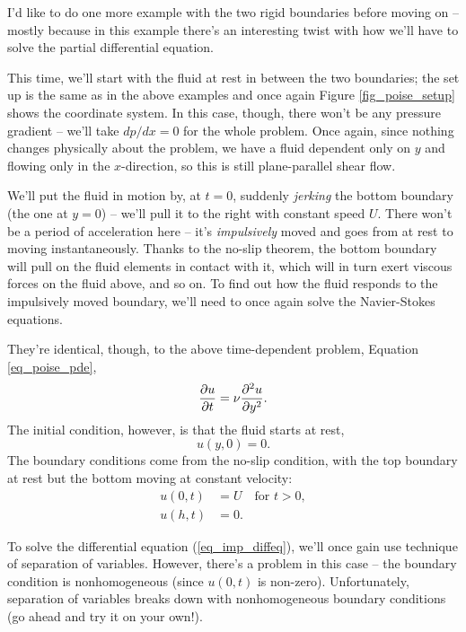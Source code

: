I'd like to do one more example with the two rigid boundaries before moving on -- mostly because in this example there's an interesting twist with how we'll have to solve the partial differential equation.


This time, we'll start with the fluid at rest in between the two boundaries; the set up is the same as in the above examples and  once again Figure \ref{fig_poise_setup} shows the coordinate system.  In this case, though, there won't be any pressure gradient -- we'll take $dp/dx = 0$ for the whole problem.  Once again, since nothing changes physically about the problem, we have a fluid dependent only on $y$ and flowing only in the $x$-direction, so this is still plane-parallel shear flow.  

We'll put the fluid in motion by, at $t = 0$,  suddenly \emph{jerking} the bottom boundary (the one at $y=0$)  -- we'll pull it to the right with constant speed $U$.  There won't be a period of acceleration here -- it's \emph{impulsively} moved and goes from at rest to moving instantaneously.  Thanks to the no-slip theorem, the bottom boundary will pull on the fluid elements in contact with it, which will in turn exert viscous forces on the fluid above, and so on.  To find out how the fluid responds to the impulsively moved boundary, we'll need to once again solve the Navier-Stokes equations.

They're identical, though, to the above time-dependent problem, Equation \ref{eq_poise_pde},
\begin{equation}
\label{eq_imp_diffeq}
\frac{\partial {u}}{\partial {t}} = \nu \frac{\partial^2 {u}}{\partial {y}^2}.
\end{equation}
The initial condition, however, is that the fluid starts at rest,
\begin{equation}
u(y, 0) = 0.
\end{equation}
The boundary conditions come from the no-slip condition, with the top boundary at rest but the bottom moving at constant velocity:
\begin{align}
u(0, t) & = U \quad \text{for } t>0, \\
u(h, t) & = 0.
\end{align}

To solve the differential equation (\ref{eq_imp_diffeq}), we'll once gain use technique of separation of variables.  However, there's a problem in this case -- the boundary condition is nonhomogeneous (since $u(0,t)$ is non-zero).  Unfortunately, separation of variables breaks down with nonhomogeneous boundary conditions (go ahead and try it on your own!).  


